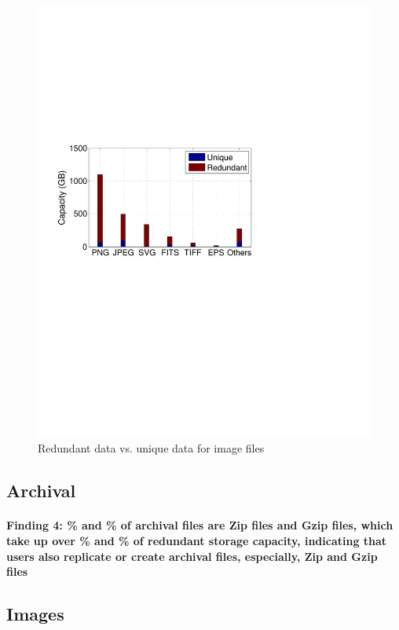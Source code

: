 \begin{figure}[t]
\begin{minipage}{0.28\textwidth}
		\includegraphics[width=1\textwidth]{graphs/type-image-cap}
		\caption{Redundant data vs. unique data for image files}
		\label{fig-file}
	\end{minipage}
\end{figure}

\subsection{Archival}
\paragraph{Finding 4: \% and \% of archival files are Zip files and Gzip files, which take up over \% and \% of redundant storage capacity, indicating that users also replicate or create archival files, especially, Zip and Gzip files}

\subsection{Images}
